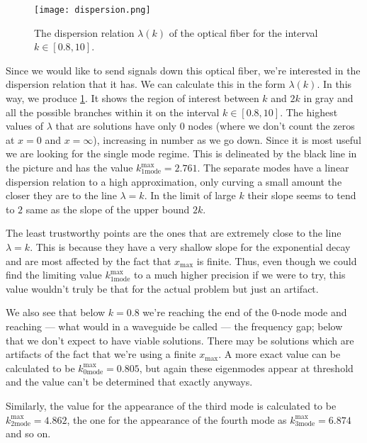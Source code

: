 \documentclass[10pt,a4paper,twocolumn]{article}
\begin{document}
\begin{figure}[!h]
    \centering
    \texttt{[image: dispersion.png]}
    \caption{The dispersion relation $\lambda(k)$ of the optical fiber for the interval $k \in [0.8, 10]$.}
    \label{fig:dispersion}
\end{figure}

Since we would like to send signals down this optical fiber, we're interested in the dispersion relation that it has. We can calculate this in the form $\lambda(k)$. In this way, we produce \cref{fig:dispersion}. It shows the region of interest between $k$ and $2k$ in gray and all the possible branches within it on the interval $k \in [0.8, 10]$. The highest values of $\lambda$ that are solutions have only $0$ nodes (where we don't count the zeros at $x=0$ and $x=\infty$), increasing in number as we go down. Since it is most useful we are looking for the single mode regime. This is delineated by the black line in the picture and has the value $k_{\mathrm{1mode}}^{\mathrm{max}} = 2.761$. The separate modes have a linear dispersion relation to a high approximation, only curving a small amount the closer they are to the line $\lambda = k$. In the limit of large $k$ their slope seems to tend to $2$ same as the slope of the upper bound $2k$.

The least trustworthy points are the ones that are extremely close to the line $\lambda = k$. This is because they have a very shallow slope for the exponential decay and are most affected by the fact that $x_{\mathrm{max}}$ is finite. Thus, even though we could find the limiting value $k_{\mathrm{1mode}}^{\mathrm{max}}$ to a much higher precision if we were to try, this value wouldn't truly be that for the actual problem but just an artifact.

We also see that below $k=0.8$ we're reaching the end of the $0$-node mode and reaching --- what would in a waveguide be called --- the frequency gap; below that we don't expect to have viable solutions. There may be solutions which are artifacts of the fact that we're using a finite $x_{\mathrm{max}}$. A more exact value can be calculated to be $k_{\mathrm{0mode}}^{\mathrm{max}} = 0.805$, but again these eigenmodes appear at threshold and the value can't be determined that exactly anyways.

Similarly, the value for the appearance of the third mode is calculated to be $k_{\mathrm{2mode}}^{\mathrm{max}} = 4.862$, the one for the appearance of the fourth mode as $k_{\mathrm{3mode}}^{\mathrm{max}} = 6.874$ and so on.

\printbibliography
\end{document}
